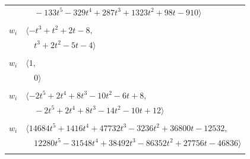 \documentclass[11pt]{article}
\begin{document}
\begin{longtable}{@{}ll@{}}
 & $\quad -133t^{5}-329t^{4}+287t^{3}+1323t^{2}+98t-910\rangle$\\
\addlinespace[2pt]
\multicolumn{2}{@{}p{0.97\textwidth}@{}}{$i=57$, $D_i=1$, $\rho_{ij}$: $1{:}2, \allowbreak 2{:}1, \allowbreak 6{:}1, \allowbreak 16{:}1, \allowbreak 26{:}1, \allowbreak 41{:}1, \allowbreak 55{:}1$}\\
$w_i$ & $\langle -t^{3}+t^{2}+2t-8,$\\
 & $\quad t^{3}+2t^{2}-5t-4\rangle$\\
\addlinespace[2pt]
\multicolumn{2}{@{}p{0.97\textwidth}@{}}{$i=58$, $D_i=1$, $\rho_{ij}$: $--$}\\
$w_i$ & $\langle 1,$\\
 & $\quad 0\rangle$\\
\addlinespace[2pt]
\multicolumn{2}{@{}p{0.97\textwidth}@{}}{$i=59$, $D_i=1$, $\rho_{ij}$: $0{:}2, \allowbreak 1{:}2, \allowbreak 2{:}1, \allowbreak 4{:}2, \allowbreak 17{:}2, \allowbreak 26{:}1, \allowbreak 32{:}2, \allowbreak 50{:}1, \allowbreak 61{:}1$}\\
$w_i$ & $\langle -2t^{5}+2t^{4}+8t^{3}-10t^{2}-6t+8,$\\
 & $\quad -2t^{5}+2t^{4}+8t^{3}-14t^{2}-10t+12\rangle$\\
\addlinespace[2pt]
\multicolumn{2}{@{}p{0.97\textwidth}@{}}{$i=60$, $D_i=1$, $\rho_{ij}$: $0{:}1, \allowbreak 2{:}1, \allowbreak 6{:}1, \allowbreak 8{:}2, \allowbreak 9{:}1, \allowbreak 11{:}1, \allowbreak 12{:}1, \allowbreak 13{:}2, \allowbreak 18{:}1, \allowbreak 19{:}2, \allowbreak 21{:}2, \allowbreak 24{:}2, \allowbreak 25{:}1, \allowbreak 26{:}1, \allowbreak 32{:}2, \allowbreak 36{:}1, \allowbreak 37{:}2, \allowbreak 39{:}1, \allowbreak 47{:}2, \allowbreak 68{:}2, \allowbreak 69{:}1, \allowbreak 74{:}1, \allowbreak 81{:}1, \allowbreak 82{:}2, \allowbreak 84{:}2, \allowbreak 89{:}1, \allowbreak 95{:}1, \allowbreak 97{:}2$}\\
$w_i$ & $\langle 14684t^{5}+1416t^{4}+47732t^{3}-3236t^{2}+36800t-12532,$\\
 & $\quad 12280t^{5}-31548t^{4}+38492t^{3}-86352t^{2}+27756t-46836\rangle$\\
\addlinespace[2pt]
\multicolumn{2}{@{}p{0.97\textwidth}@{}}{$i=61$, $D_i=43$, $\rho_{ij}$: $0{:}2, \allowbreak 2{:}2, \allowbreak 9{:}1, \allowbreak 10{:}2, \allowbreak 18{:}1, \allowbreak 19{:}2, \allowbreak 20{:}2, \allowbreak 27{:}2, \allowbreak 29{:}2, \allowbreak 32{:}1, \allowbreak 36{:}1, \allowbreak 37{:}2, \allowbreak 38{:}1, \allowbreak 40{:}2, \allowbreak 47{:}2, \allowbreak 59{:}2, \allowbreak 63{:}2, \allowbreak 64{:}1, \allowbreak 65{:}2, \allowbreak 67{:}1, \allowbreak 68{:}2, \allowbreak 70{:}2, \allowbreak 71{:}1, \allowbreak 75{:}1, \allowbreak 78{:}1, \allowbreak 79{:}2, \allowbreak 82{:}1, \allowbreak 89{:}1$}\\

\end{longtable}
\end{document}
